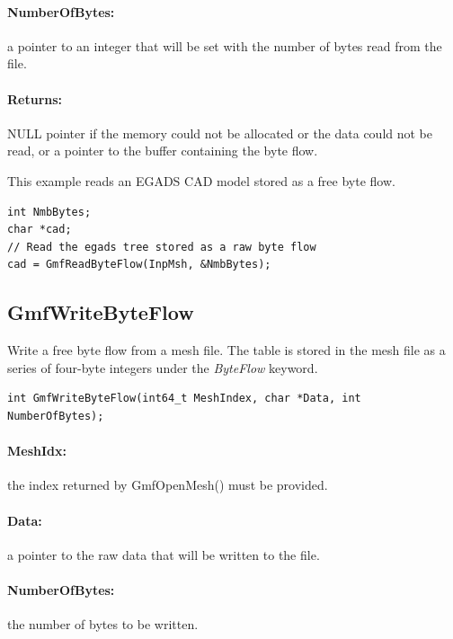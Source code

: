 \documentclass[a4paper,12pt]{article}
\begin{document}
\paragraph{NumberOfBytes:} a pointer to an integer that will be set with the number of bytes read from the file.

\paragraph{Returns:} NULL pointer if the memory could not be allocated or the data could not be read, or a pointer to the buffer containing the byte flow.

This example reads an EGADS CAD model stored as a free byte flow.

\begin{tt}
\begin{verbatim}
int NmbBytes;
char *cad;
// Read the egads tree stored as a raw byte flow
cad = GmfReadByteFlow(InpMsh, &NmbBytes);
\end{verbatim}
\end{tt}
\normalfont


\subsection{GmfWriteByteFlow}
Write a free byte flow from a mesh file.
The table is stored in the mesh file as a series of four-byte integers under the \emph{ByteFlow} keyword.

\begin{tt}
\begin{verbatim}
int GmfWriteByteFlow(int64_t MeshIndex, char *Data, int NumberOfBytes);
\end{verbatim}
\end{tt}
\normalfont

\paragraph{MeshIdx:}
the index returned by GmfOpenMesh() must be provided.

\paragraph{Data:} a pointer to the raw data that will be written to the file.

\paragraph{NumberOfBytes:} the number of bytes to be written.
\end{document}
